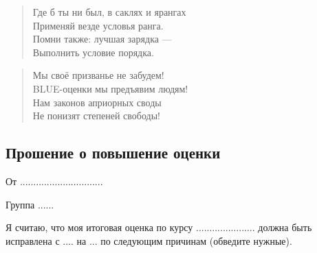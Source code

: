 \documentclass[12pt, a4paper]{article}\usepackage[]{graphicx}\usepackage[]{color}
\begin{document}
\begin{verse}
Где б ты ни был, в саклях и ярангах \\
Применяй везде условья ранга. \\
Помни также: лучшая зарядка — \\
Выполнить условие порядка.
\end{verse}

\begin{verse}
Мы своё призванье не забудем! \\
BLUE-оценки мы предъявим людям! \\
Нам законов априорных своды \\
Не понизят степеней свободы!
\end{verse}



\subsection{Прошение о повышение оценки}

\vspace{10pt}
От ...............................

\vspace{10pt}
Группа ......

\vspace{10pt}
Я считаю, что моя итоговая оценка по курсу ...................... должна быть исправлена с .... на ... по следующим причинам (обведите нужные).
\end{document}
